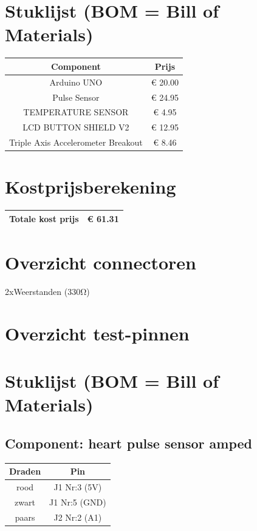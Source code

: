 \documentclass[a4paper]{report}
\begin{document}
\section{Stuklijst (BOM = Bill of Materials)}
\begin{tabular}{|c|c|}
    \hline
    Component & Prijs\\
    \hline
    Arduino UNO                        & € 20.00\\
    Pulse Sensor                       & € 24.95\\
    TEMPERATURE SENSOR                 & €  4.95\\
    LCD BUTTON SHIELD V2               & € 12.95\\
    Triple Axis Accelerometer Breakout & €  8.46\\
    \hline
\end{tabular}

\section{Kostprijsberekening}
\begin{tabular}{|c|c|}
    \hline
    Totale kost prijs & € 61.31\\
    \hline
\end{tabular}

\section{Overzicht connectoren}
2xWeerstanden (330Ω)

\section{Overzicht test-pinnen}
\section{Stuklijst (BOM = Bill of Materials)}
\subsection{Component: heart pulse sensor amped}
\begin{tabular}{|c|c|}
    \hline
    Draden & Pin\\
    \hline
    rood  & J1 Nr:3 (5V)\\
    zwart & J1 Nr:5 (GND)\\
    paars & J2 Nr:2 (A1)\\
    \hline
\end{tabular}
\end{document}
